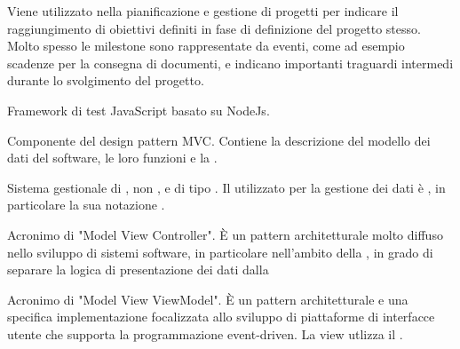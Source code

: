 {Viene utilizzato nella pianificazione e gestione di progetti per indicare il raggiungimento di obiettivi definiti in fase di definizione del progetto stesso. Molto spesso le milestone sono rappresentate da eventi, come ad esempio scadenze per la consegna di documenti, e indicano importanti traguardi intermedi durante lo svolgimento del progetto.}

{Framework di test JavaScript basato su NodeJs.}

{Componente del design pattern MVC. Contiene la descrizione del modello dei dati del software, le loro funzioni e la .}

{Sistema gestionale di , non ,  e di tipo . Il  utilizzato per la gestione dei dati è , in particolare la sua notazione .}

{Acronimo di "Model View Controller". \`{E} un pattern architetturale molto diffuso nello sviluppo di sistemi software, in particolare nell'ambito della , in grado di separare la logica di presentazione dei dati dalla }

{Acronimo di "Model View ViewModel". \`{E} un pattern architetturale e una specifica implementazione focalizzata allo sviluppo di piattaforme di interfacce utente che supporta la programmazione event-driven. La view utlizza il .}
